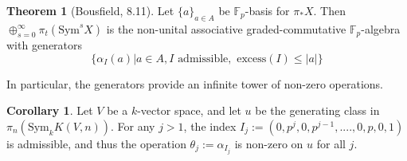 \documentclass{article}
\newcommand{\Sym}{\textrm{Sym}}
\theoremstyle{definition}
\newtheorem{theorem}{Theorem}[section]
\theoremstyle{definition}
\theoremstyle{definition}
\theoremstyle{definition}
\theoremstyle{definition}
\theoremstyle{definition}
\theoremstyle{definition}
\newtheorem{corollary}{Corollary}[theorem]
\theoremstyle{definition}
\begin{document}
\begin{theorem}[Bousfield, 8.11]
    \label{generator}
    Let $\{a\}_{a\in A}$ be $\mathbb{F}_p$-basis for $\pi_*X$. Then $\oplus_{s=0}^{\infty} \pi_t(\Sym^s X)$ is the non-unital associative graded-commutative $\mathbb{F}_p$-algebra with generators 
    \[\{\alpha_{I}(a) | a\in A, I \textrm{ admissible}, \textrm{ excess}(I)\leq |a| \}\]
\end{theorem}

In particular, the generators provide an infinite tower of non-zero operations.
\begin{corollary}
    \label{tower}
    Let $V$ be a $k$-vector space, and let $u$ be the generating class in $\pi_n(\Sym_k K(V,n))$. For any $j>1$, the index $I_j:=(0,p^{j},0,p^{j-1},....,0,p,0,1)$ is admissible, and thus the operation $\theta_j:=\alpha_{I_j}$ is non-zero on $u$ for all $j$.
\end{corollary}
\end{document}
